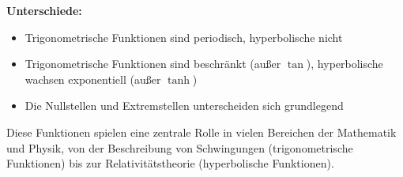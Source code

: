 \documentclass{article}
\begin{document}
\textbf{Unterschiede:}
\begin{itemize}
\item Trigonometrische Funktionen sind periodisch, hyperbolische nicht
\item Trigonometrische Funktionen sind beschränkt (außer $\tan$), hyperbolische wachsen exponentiell (außer $\tanh$)
\item Die Nullstellen und Extremstellen unterscheiden sich grundlegend
\end{itemize}

Diese Funktionen spielen eine zentrale Rolle in vielen Bereichen der Mathematik und Physik, von der Beschreibung von Schwingungen (trigonometrische Funktionen) bis zur Relativitätstheorie (hyperbolische Funktionen).
\end{document}
